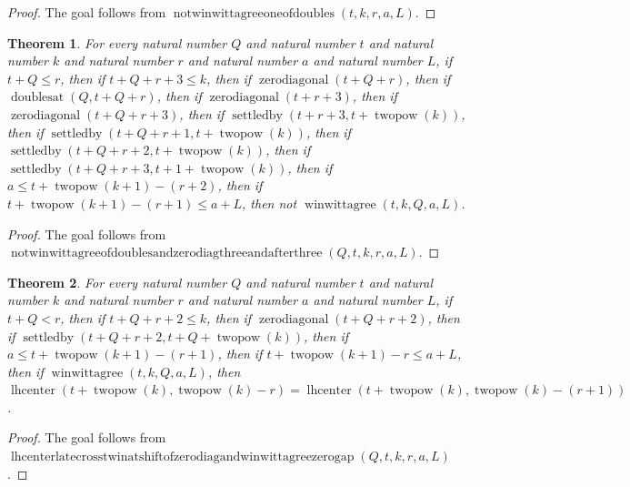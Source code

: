 \documentclass[11pt]{article}
\newtheorem{theorem}{Theorem}[section]
\theoremstyle{definition}
\begin{document}
\begin{proof}
The goal follows from \(\operatorname{notwinwittagreeoneofdoubles}(t, k, r, a, L)\).
\end{proof}
\begin{theorem}
\label{ll:paper:not-winwittagree-of-doubles-and-zero-diag-three-and-after-three}
For every natural number \(Q\) and natural number \(t\) and natural number \(k\) and natural number \(r\) and natural number \(a\) and natural number \(L\), if \(t + Q \le r\), then if \(t + Q + r + 3 \le k\), then if \(\operatorname{zerodiagonal}(t + Q + r)\), then if \(\operatorname{doublesat}(Q, t + Q + r)\), then if \(\operatorname{zerodiagonal}(t + r + 3)\), then if \(\operatorname{zerodiagonal}(t + Q + r + 3)\), then if \(\operatorname{settledby}(t + r + 3, t + \operatorname{twopow}(k))\), then if \(\operatorname{settledby}(t + Q + r + 1, t + \operatorname{twopow}(k))\), then if \(\operatorname{settledby}(t + Q + r + 2, t + \operatorname{twopow}(k))\), then if \(\operatorname{settledby}(t + Q + r + 3, t + 1 + \operatorname{twopow}(k))\), then if \(a \le t + \operatorname{twopow}(k + 1) - (r + 2)\), then if \(t + \operatorname{twopow}(k + 1) - (r + 1) \le a + L\), then not \(\operatorname{winwittagree}(t, k, Q, a, L)\).
\end{theorem}
\begin{proof}
The goal follows from \(\operatorname{notwinwittagreeofdoublesandzerodiagthreeandafterthree}(Q, t, k, r, a, L)\).
\end{proof}
\begin{theorem}
\label{ll:paper:lhcenter-late-cross-twin-at-shift-of-zero-diag-and-winwittagree-zero-gap}
For every natural number \(Q\) and natural number \(t\) and natural number \(k\) and natural number \(r\) and natural number \(a\) and natural number \(L\), if \(t + Q < r\), then if \(t + Q + r + 2 \le k\), then if \(\operatorname{zerodiagonal}(t + Q + r + 2)\), then if \(\operatorname{settledby}(t + Q + r + 2, t + Q + \operatorname{twopow}(k))\), then if \(a \le t + \operatorname{twopow}(k + 1) - (r + 1)\), then if \(t + \operatorname{twopow}(k + 1) - r \le a + L\), then if \(\operatorname{winwittagree}(t, k, Q, a, L)\), then \(\operatorname{lhcenter}(t + \operatorname{twopow}(k), \operatorname{twopow}(k) - r) = \operatorname{lhcenter}(t + \operatorname{twopow}(k), \operatorname{twopow}(k) - (r + 1))\).
\end{theorem}
\begin{proof}
The goal follows from \(\operatorname{lhcenterlatecrosstwinatshiftofzerodiagandwinwittagreezerogap}(Q, t, k, r, a, L)\).
\end{proof}
\end{document}

